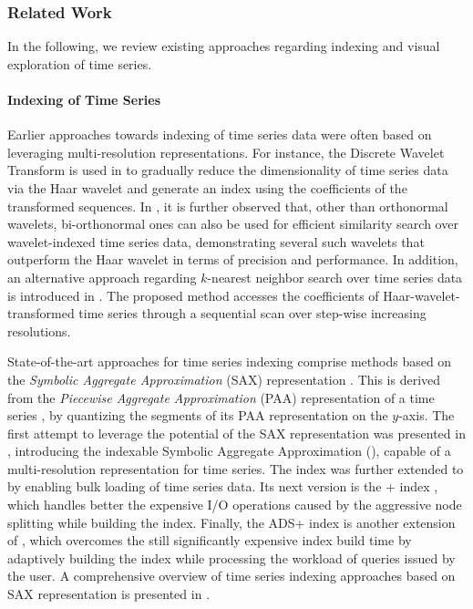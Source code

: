 \subsubsection{Related Work}
\label{sec:related}


In the following, we review existing approaches regarding indexing and visual exploration of time series.

\paragraph{Indexing of Time Series} Earlier approaches towards indexing of time series data were often based on leveraging multi-resolution representations. For instance, the Discrete Wavelet Transform \cite{graps1995cse} is used in \cite{chan1999icde} to gradually reduce the dimensionality of time series data via the Haar wavelet and generate an index using the coefficients of the transformed sequences. In \cite{popivanov2002icde}, it is further observed that, other than orthonormal wavelets, bi-orthonormal ones can also be used for efficient similarity search over wavelet-indexed time series data, demonstrating several such wavelets that outperform the Haar wavelet in terms of precision and performance. In addition, an alternative approach regarding $k$-nearest neighbor search over time series data is introduced in \cite{kashyap2011kdd}. The proposed method accesses the coefficients of Haar-wavelet-transformed time series through a sequential scan over step-wise increasing resolutions.

State-of-the-art approaches for time series indexing comprise methods based on the {\em Symbolic Aggregate Approximation} (SAX) representation \cite{jessica2007dmkd}. This is derived from the {\em Piecewise Aggregate Approximation} (PAA) representation of a time series \cite{keogh2001paa,faloutsos2000vldb}, by quantizing the segments of its PAA representation on the $y$-axis. The first attempt to leverage the potential of the SAX representation was presented in \cite{shieh2008kdd}, introducing the indexable Symbolic Aggregate Approximation (\isax), capable of a multi-resolution representation for time series. The \isax index was further extended to   \cite{camerra2010icdm} by enabling bulk loading of time series data. Its next version is the + index \cite{camerra2014kais}, which handles better the expensive I/O operations caused by the aggressive node splitting while building the index. Finally, the ADS+ index \cite{zoumpatianos2014sigmod} is another extension of \isax, which overcomes the still significantly expensive index build time by adaptively building the index while processing the workload of queries issued by the user. A comprehensive overview of time series indexing approaches based on SAX representation is presented in \cite{palpanas2016bigsm}.

